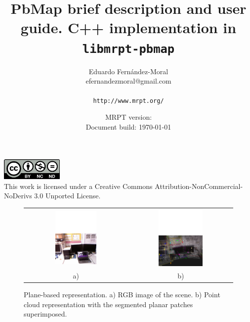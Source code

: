 \documentclass[a4paper,11pt]{article}
\title{PbMap brief description and user guide. C++ implementation in \texttt{libmrpt-pbmap}}
\author{Eduardo Fern\'andez-Moral \\ efernandezmoral@gmail.com \\
\\
\texttt{http://www.mrpt.org/} }
\date{MRPT version: \MRPTVERSION \\ Document build: \today }
\begin{document}
\maketitle


\vfill

\begin{scriptsize}
\begin{center}
\includegraphics[width=3cm]{imgs/by-nc-nd-eu.pdf}
\\
This work is licensed under a Creative Commons Attribution-NonCommercial-NoDerivs 3.0 Unported License.
\end{center}
\end{scriptsize}


\newpage
\tableofcontents
\newpage

\begin{figure}[t!]
    \begin{center}
    \begin{tabular}{cc}
		\includegraphics[width=0.42\textwidth]{imgs/scene.pdf} & \includegraphics[width=0.45\textwidth]{imgs/pbmap.pdf} \\
		\scriptsize a) & \scriptsize b) \\
    \end{tabular}
    \end{center}
    \caption{Plane-based representation. a) RGB image of the scene. b) Point cloud representation with the segmented planar patches superimposed.}
	\label{fig:pbmap}
\end{figure}
\end{document}
